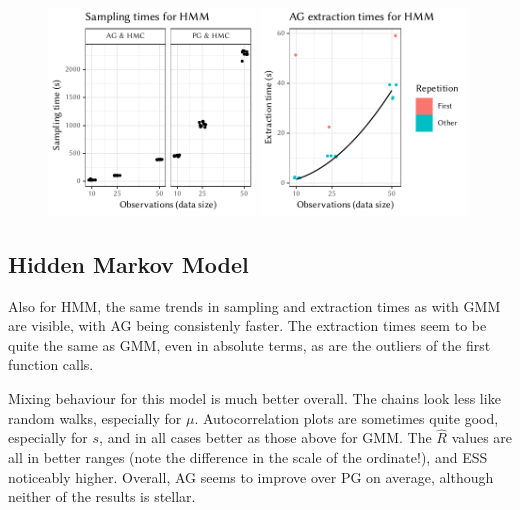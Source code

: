 \cleartoverso
\FloatBlock

\begin{figure}[t!]
  \centering
    \includegraphics[width=0.49\textwidth]{figures/HMM-sampling_times}
  \includegraphics[width=0.49\textwidth]{figures/HMM-compile_times}
  \caption{}
  \label{fig:plots-hmm}
\end{figure}

\subsection*{Hidden Markov Model}

Also for HMM, the same trends in sampling and extraction times as with GMM are visible, with AG
being consistenly faster.  The extraction times seem to be quite the same as GMM, even in absolute
terms, as are the outliers of the first function calls.

Mixing behaviour for this model is much better overall.  The chains look less like random walks,
especially for \(\mu\).  Autocorrelation plots are sometimes quite good, especially for \(s\), and
in all cases better as those above for GMM.  The \(\widehat{R}\) values are all in better ranges
(note the difference in the scale of the ordinate!), and ESS noticeably higher.  Overall, AG seems
to improve over PG on average, although neither of the results is stellar.

